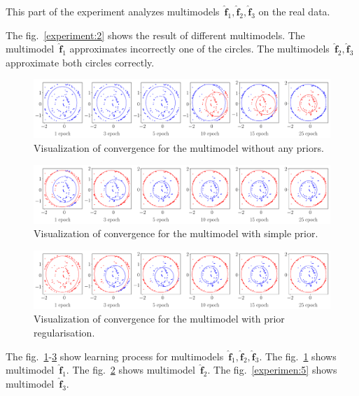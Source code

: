 \documentclass[12pt, twoside]{article}
\numberwithin{equation}{section}
\begin{document}
This part of the experiment analyzes multimodels~$\hat{\mathbf{f}}_1, \hat{\mathbf{f}}_2, \hat{\mathbf{f}}_3$ on the real data.

The fig.~\ref{experiment:2} shows the result of different multimodels.
The multimodel~$\hat{\mathbf{f}}_1$ approximates incorrectly one of the circles.
The multimodels~$\hat{\mathbf{f}}_2, \hat{\mathbf{f}}_3$ approximate both circles correctly.

\begin{figure}[h!t]\center
\includegraphics[width=1\textwidth]{result_eng/experiment_real_not_prior}
\caption{Visualization of convergence for the multimodel without any priors.}
\label{experiment:3}
\end{figure}

\begin{figure}[h!t]\center
\includegraphics[width=1\textwidth]{result_eng/experiment_real_prior}
\caption{Visualization of convergence for the multimodel with simple prior.}
\label{experiment:4}
\end{figure}

\begin{figure}[h!t]\center
\includegraphics[width=1\textwidth]{result_eng/experiment_real_regular}
\caption{Visualization of convergence for the multimodel with prior regularisation.}
\label{experiment:5}
\end{figure}

The fig.~\ref{experiment:3}-\ref{experiment:5} show learning process for multimodels~$\hat{\mathbf{f}}_1, \hat{\mathbf{f}}_2, \hat{\mathbf{f}}_3$.
The fig.~\ref{experiment:3} shows multimodel~$\hat{\mathbf{f}}_1$.
The fig.~\ref{experiment:4} shows multimodel~$\hat{\mathbf{f}}_2$.
The fig.~\ref{experimen:5} shows multimodel~$\hat{\mathbf{f}}_3$.
\end{document}
